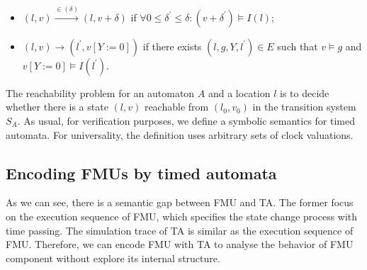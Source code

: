 \begin{itemize}
\item
$(l,v) \xrightarrow{\in(\delta)} (l,v+\delta)$ if $\forall0 \leqslant \delta^{\prime} \leqslant \delta : (v + \delta^{\prime}) \models I(l)$;
\item
$(l,v) \rightarrow(l^{\prime},v[Y := 0])$ if there exists $(l,g,Y,l^{\prime}) \in E$ such that $v \models g$ and $v[Y := 0 ] \models I(l^{\prime})$.
\end{itemize}
The reachability problem for an automaton $A$ and a location $l$ is to decide whether there is a state $(l,v)$ reachable from $(l_{0},v_{0})$ in the transition system $S_{A}$. As usual, for verification purposes, we define a symbolic semantics for timed automata. For universality, the definition uses arbitrary sets of clock valuations.
\subsection{Encoding FMUs by timed automata}
As we can see, there is a semantic gap between FMU and TA. The former focus on the execution sequence of FMU, which specifies the state change process with time passing. The simulation trace of TA is similar as the execution sequence of FMU. Therefore, we can encode FMU with TA to analyse the behavior of FMU component without explore its internal structure.

